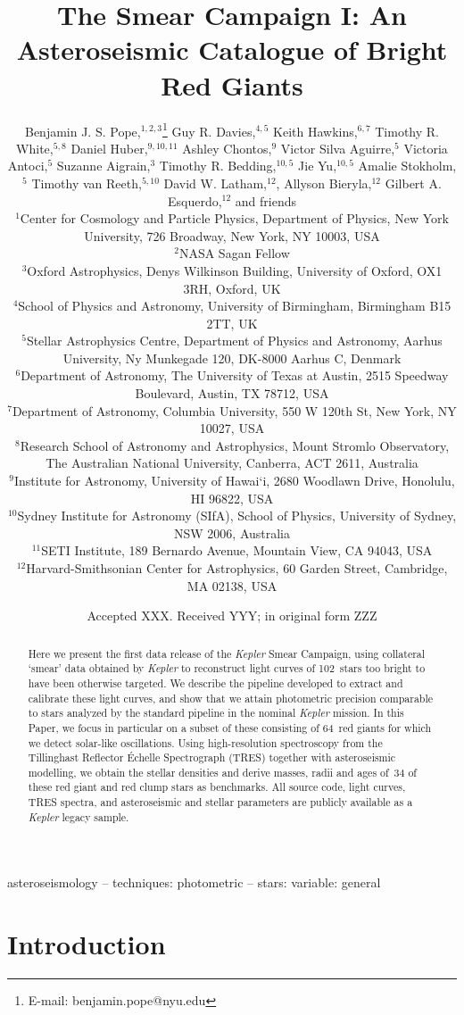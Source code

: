 \documentclass[a4paper,fleqn,usenatbib]{mnras}
\title[The Kepler Smear Campaign]{The \kepler Smear Campaign I: An Asteroseismic Catalogue of Bright Red Giants}
\author[B. J. S. Pope et al.]{Benjamin J. S. Pope,$^{1,2,3}$\thanks{E-mail: benjamin.pope@nyu.edu}
Guy R. Davies,$^{4,5}$
Keith Hawkins,$^{6,7}$
Timothy R. White,$^{5,8}$\newauthor
Daniel Huber,$^{9,10,11}$
Ashley Chontos,$^{9}$
Victor Silva Aguirre,$^{5}$
Victoria Antoci,$^{5}$\newauthor
Suzanne Aigrain,$^{3}$ 
Timothy R. Bedding,$^{10,5}$
Jie Yu,$^{10,5}$ 
Amalie Stokholm,$^{5}$\newauthor
Timothy van Reeth,$^{5,10}$
David W. Latham,$^{12}$,
Allyson Bieryla,$^{12}$
Gilbert A. Esquerdo,$^{12}$\newauthor
and friends
\\
$^{1}$Center for Cosmology and Particle Physics, Department of Physics, New York University, 726 Broadway, New York, NY 10003, USA\\
$^{2}$NASA Sagan Fellow\\
$^{3}$Oxford Astrophysics, Denys Wilkinson Building, University of Oxford, OX1 3RH, Oxford, UK\\
$^{4}$School of Physics and Astronomy, University of Birmingham, Birmingham B15 2TT, UK\\
$^{5}$Stellar Astrophysics Centre, Department of Physics and Astronomy, Aarhus University, Ny Munkegade 120, DK-8000 Aarhus C, Denmark\\
$^{6}$Department of Astronomy, The University of Texas at Austin, 2515 Speedway Boulevard, Austin, TX 78712, USA\\
$^{7}$Department of Astronomy, Columbia University, 550 W 120th St, New York, NY 10027, USA\\
$^{8}$Research School of Astronomy and Astrophysics, Mount Stromlo Observatory, The Australian National University, Canberra, ACT 2611, Australia\\
$^{9}$Institute for Astronomy, University of Hawai‘i, 2680 Woodlawn Drive, Honolulu, HI 96822, USA\\
$^{10}$Sydney Institute for Astronomy (SIfA), School of Physics, University of Sydney, NSW 2006, Australia\\
$^{11}$SETI Institute, 189 Bernardo Avenue, Mountain View, CA 94043, USA\\
$^{12}$Harvard-Smithsonian Center for Astrophysics, 60 Garden Street, Cambridge, MA 02138, USA
}
\date{Accepted XXX. Received YYY; in original form ZZZ}
\newcommand{\kepler}{\emph{Kepler}\xspace}
\begin{document}
\label{firstpage}
\pagerange{\pageref{firstpage}--\pageref{lastpage}}
\maketitle

\begin{abstract}
Here we present the first data release of the \kepler Smear Campaign, using collateral `smear' data obtained by \kepler to reconstruct light curves of 102~stars too bright to have been otherwise targeted. We describe the pipeline developed to extract and calibrate these light curves, and show that we attain photometric precision comparable to stars analyzed by the standard pipeline in the nominal \kepler mission. In this Paper, we focus in particular on a subset of these consisting of 64~red giants for which we detect solar-like oscillations. Using high-resolution spectroscopy from the Tillinghast Reflector \'{E}chelle Spectrograph (TRES) together with asteroseismic modelling, we obtain the stellar densities and derive masses, radii and ages of~34 of these red giant and red clump stars as benchmarks. All source code, light curves, TRES spectra, and asteroseismic and stellar parameters are publicly available as a \kepler legacy sample.
\end{abstract}

\begin{keywords}
asteroseismology -- techniques: photometric -- stars: variable: general
\end{keywords}



\section{Introduction}
\label{intro}

\end{document}
